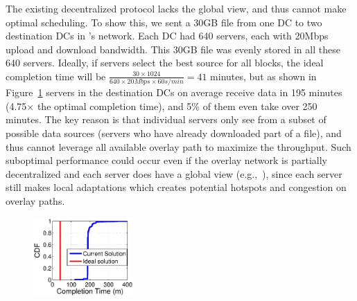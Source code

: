 The existing decentralized protocol lacks the global view, and thus cannot make optimal scheduling.
To show this, we sent a 30GB file from one DC to two destination
DCs in \company's network.
Each DC had 640 servers, each with 20Mbps upload and download
bandwidth. This 30GB file was evenly stored in all these
640 servers.
Ideally, if servers select
the best source for all blocks, the ideal
completion time will be
$\frac{30\times 1024}{640\times 20Mbps \times 60s/min} = 41$
minutes, but as shown in Figure~\ref{fig:motivation}
servers in the destination DCs on average receive data in
195 minutes (4.75$\times$ the optimal completion
time), and 5\% of them even take over 250 minutes.
The key reason is that
individual servers only see from a subset of possible data sources
(servers who have already downloaded part of a file),
and thus cannot leverage all available overlay path to
maximize the throughput.
Such suboptimal performance
could occur even if the overlay
network is partially decentralized and each server does have a
global view (e.g.,~\cite{Huang2014A}),
since each server still makes local adaptations which creates potential
hotspots and congestion on overlay paths.


\begin{figure}[t]
  \centering
  \includegraphics[width=1.5in]{images/SEvsIdeal.eps}
  \vspace{-0.2cm}
  \label{fig:motivation}
\vspace{-0.4cm}
\end{figure}


